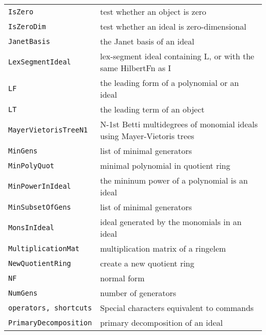 \documentclass[a4paper]{mybook}
\begin{document}
\begin{center}
\begin{longtable}{ll}
{\verb~IsZero~} &
      test whether an object is zero\\
   
{\verb~IsZeroDim~} &
      test whether an ideal is zero-dimensional\\
   
{\verb~JanetBasis~} &
      the Janet basis of an ideal\\
   
{\verb~LexSegmentIdeal~} &
      lex-segment ideal containing L, or with the same HilbertFn as I\\
   
{\verb~LF~} &
      the leading form of a polynomial or an ideal\\
   
{\verb~LT~} &
      the leading term of an object\\
   
{\verb~MayerVietorisTreeN1~} &
      N-1st Betti multidegrees of monomial ideals using Mayer-Vietoris trees\\
   
{\verb~MinGens~} &
      list of minimal generators\\
   
{\verb~MinPolyQuot~} &
      minimal polynomial in quotient ring\\
   
{\verb~MinPowerInIdeal~} &
      the mininum power of a polynomial is an ideal\\
   
{\verb~MinSubsetOfGens~} &
      list of minimal generators\\
   
{\verb~MonsInIdeal~} &
      ideal generated by the monomials in an ideal\\
   
{\verb~MultiplicationMat~} &
      multiplication matrix of a ringelem\\
   
{\verb~NewQuotientRing~} &
      create a new quotient ring\\
   
{\verb~NF~} &
      normal form\\
   
{\verb~NumGens~} &
      number of generators\\
   
{\verb~operators, shortcuts~} &
      Special characters equivalent to commands\\
   
{\verb~PrimaryDecomposition~} &
      primary decomposition of an ideal\\
   

\end{longtable}
\end{center}
\end{document}
